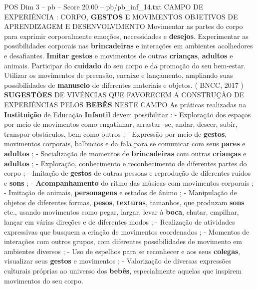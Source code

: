 \begin{textsample}{POS Dim 3 – pb – Score 20.00 – pb/pb\_inf\_14.txt}  \label{ex:f3_pos_089}
CAMPO DE EXPERIÊNCIA : CORPO, \textbf{GESTOS} E MOVIMENTOS OBJETIVOS DE APRENDIZAGEM E DESENVOLVIMENTO Movimentar as partes do corpo para exprimir corporalmente emoções, necessidades e \textbf{desejos}.
Experimentar as possibilidades corporais nas \textbf{brincadeiras} e interações em ambientes acolhedores e desafiantes. \textbf{Imitar} \textbf{gestos} e movimentos de outras \textbf{crianças}, \textbf{adultos} e animais.
Participar do \textbf{cuidado} do seu corpo e da promoção do seu bem-estar.
Utilizar os movimentos de preensão, encaixe e lançamento, ampliando suas possibilidades de \textbf{manuseio} de diferentes materiais e objetos. ( BNCC, 2017 ) \textbf{SUGESTÕES} DE VIVÊNCIAS QUE FAVORECEM A CONSTRUÇÃO DE EXPERIÊNCIAS PELOS \textbf{BEBÊS} NESTE CAMPO As práticas realizadas na \textbf{Instituição} de Educação \textbf{Infantil} devem possibilitar : - Exploração dos espaços por meio de movimentos como engatinhar, arrastar -se, andar, descer, subir, transpor obstáculos, bem como outros ; - Expressão por meio de \textbf{gestos}, movimentos corporais, balbucios e da fala para se comunicar com seus \textbf{pares} e \textbf{adultos} ; - Socialização de momentos de \textbf{brincadeiras} com outras \textbf{crianças} e \textbf{adultos} ; - Exploração, conhecimento e reconhecimento de diferentes partes do corpo ; - Imitação de \textbf{gestos} de outras pessoas e reprodução de diferentes ruídos e \textbf{sons} ; - \textbf{Acompanhamento} do ritmo das músicas com movimentos corporais ; - Imitação de animais, \textbf{personagens} e estados de ânimo ; - Manipulação de objetos de diferentes formas, \textbf{pesos}, \textbf{texturas}, tamanhos, que produzam \textbf{sons} etc., usando movimentos como pegar, largar, levar à \textbf{boca}, chutar, empilhar, lançar em várias direções e de diferentes modos ; - Realização de atividades expressivas que busquem a criação de movimentos coordenados ; - Momentos de interações com outros grupos, com diferentes possibilidades de movimento em ambientes diversos ; - Uso de espelhos para se reconhecer e aos seus \textbf{colegas}, visualizar seus \textbf{gestos} e movimentos ; - Valorização de diversas expressões culturais próprias ao universo dos \textbf{bebês}, especialmente aquelas que inspirem movimentos do seu corpo.

\end{textsample}
